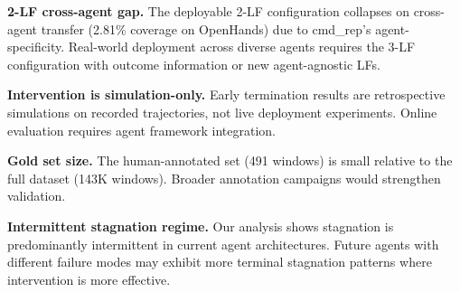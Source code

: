 \documentclass[11pt,a4paper]{article}
\begin{document}
\textbf{2-LF cross-agent gap.} The deployable 2-LF configuration collapses on cross-agent transfer (2.81\% coverage on OpenHands) due to cmd\_rep's agent-specificity. Real-world deployment across diverse agents requires the 3-LF configuration with outcome information or new agent-agnostic LFs.

\textbf{Intervention is simulation-only.} Early termination results are retrospective simulations on recorded trajectories, not live deployment experiments. Online evaluation requires agent framework integration.

\textbf{Gold set size.} The human-annotated set (491 windows) is small relative to the full dataset (143K windows). Broader annotation campaigns would strengthen validation.

\textbf{Intermittent stagnation regime.} Our analysis shows stagnation is predominantly intermittent in current agent architectures. Future agents with different failure modes may exhibit more terminal stagnation patterns where intervention is more effective.
\end{document}
